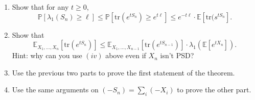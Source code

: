 \documentclass{article}
\theoremstyle{plain}
\newcommand{\E}{\mathbb{E}}
\newcommand{\tr}{\mathrm{tr}}
\renewcommand{\P}{\mathbb{P}}
\begin{document}
\begin{enumerate}
\begin{enumerate}
  \begin{enumerate}
  \item $\tr(A) = \sum_i \lambda_i (A)$
  \item $\lambda_i (e^A) = e^{\lambda_i(A)}$
  \item The Golden-Thompson inequality: $\tr(e^{A+B}) \leq \tr(e^A \cdot e^B)$.
  \item For PSD matrices $A$ and $B$, $\tr(AB) \leq \tr(A)\cdot \tr(B)$.\
  \item Expectations and trace commute: $\E[\tr(A)] = \tr(\E[A])$.
  \end{enumerate}
\item Show that for any $t \geq 0$,
  \[\P[\lambda_1(S_n) \geq \ell] \leq \P[\tr(e^{tS_n}) \geq e^{t\ell}] \leq e^{-t\ell} \cdot \E[\tr(s^{tS_n}].\]
\item Show that
  \[\E_{X_1, \ldots, X_n}[\tr(e^{tS_n})]\leq \E_{X_1, \ldots, X_{n-1}} [\tr(e^{tS_{n-1}})]\cdot \lambda_1 (\E[e^{tX_n}]).\]
  Hint: why can you use $(iv)$ above even if $X_n$ isn't PSD?
\item Use the previous two parts to prove the first statement of the theorem.
  \item Use the same arguments on $(-S_n) = \sum_i (-X_i)$ to prove the other part.
\end{enumerate}
\end{enumerate}
\end{document}

